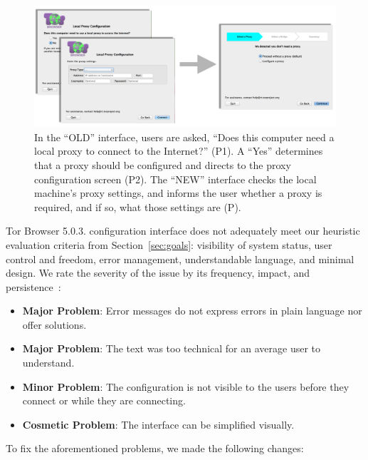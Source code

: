 \documentclass[USenglish,oneside,twocolumn]{article}
\begin{document}
\begin{figure}[t]
	\centering
		\includegraphics[width=.8\textwidth]{proxy-screens.pdf} 
		\caption{In the ``OLD'' interface, users are asked, ``Does this computer need a local proxy to connect
		to the Internet?'' (P1). A ``Yes'' determines that a proxy should be configured and directs to the 
		proxy configuration screen (P2). The ``NEW'' interface checks the local machine's proxy settings,
		and informs the user whether a proxy is required, and if so, what those settings are (P).}
\end{figure} 

Tor Browser 5.0.3. configuration interface does not adequately meet our heuristic evaluation criteria from Section~\ref{sec:goals}: visibility of system status, user control and freedom, error management, understandable language, and minimal design. We rate the severity of the issue by its frequency, impact, and persistence~\cite{nielsen1994heuristic}:\\

\begin{itemize}
\item {\bfseries Major Problem}: Error messages do not express errors in plain language nor offer solutions. 
\item {\bfseries Major Problem}: The text was too technical for an average user to understand. 
\item {\bfseries Minor Problem}: The configuration is not visible to the users before they connect or while they are connecting.
\item {\bfseries Cosmetic Problem}: The interface can be simplified visually.  
 \end{itemize} 

To fix the aforementioned problems, we made the following changes: \\
\end{document}
